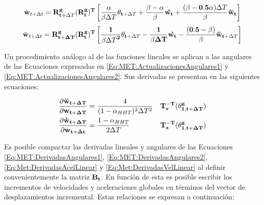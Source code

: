\begin{equation}
\label{Eq:MET:ActualizacionesAngulares1}
\begin{aligned}
\dot{\bf{w}}_{t+\Delta t} ={} & \bf{R}^g_{t+ \text{$\Delta T$}}(\bf{R}^g_{t})^T\left[\frac{\alpha}{\beta\text{$\Delta T$}}\bf{\theta}_{t+\text{$\Delta T$}}+
\frac{\beta-\alpha}{\beta}\bf{\dot{w_t}+\frac{(\beta-0.5\alpha)\text{$\Delta T$}}{\beta}}	\ddot{\bf{w}}_{t} \right ] \\
\end{aligned}
\end{equation}
\vspace{-.5cm}
\begin{equation}
\label{Eq:MET:ActualizacionesAngulares2}
\begin{aligned}
\ddot{\bf{w}}_{t+\Delta t}={} &\bf{R}^g_{t+\Delta T}(\bf{R}^g_{t})^T\left[\frac{1}{\beta\text{$\Delta T$}^2}\bf{\theta}_{t+\text{$\Delta T$}}-	\frac{1}{\beta \Delta T}\bf{\dot{w_t}-\frac{(0.5-\beta)}{\beta}}	\ddot{\bf{w}}_{t+\text{$\Delta T$}} \right ] \\
\end{aligned}
\end{equation}

Un procedimiento análogo al de las funciones lineales se aplican a las angulares de las Ecuaciones expresadas en \eqref{Eq:MET:ActualizacionesAngulares1} y \eqref{Eq:MET:ActualizacionesAngulares2}. Sus derivadas se presentan en las siguientes ecuaciones:

\begin{eqnarray}
	\label{Eq:MET:DerivadasAngulares1}
	\frac{\partial \bf{\ddot{w}_{t+\Delta T}}}{\partial \bf{{w}_{t+\Delta T}}}& = 
	\frac{4}{(1-\alpha_{HHT})^2 \Delta T^2}&  \bf{T_s^{-T}}(\bf{\theta^g_{1,{t+\Delta T}}})\\
	\label{Eq:MET:DerivadasAngulares2}
	\frac{\partial \bf{\dot{w}_{t+\Delta T}}}{\partial \bf{{w}_{t+\Delta t}}}& = 
	\frac{1-\alpha_{HHT}}{2\Delta T}& \bf{T_s^{-T}}(\bf{\theta^g_{1,{t+\Delta T}}})
\end{eqnarray}

Es posible compactar las derivadas lineales y angulares de las Ecuaciones \eqref{Eq:MET:DerivadasAngulares1}, \eqref{Eq:MET:DerivadasAngulares2}, \eqref{Eq:Met:DerivadasAcelLinear} y \eqref{Eq:Met:DerivadasVelLinear} al definir convenientemente la matriz $\bf{B_t}$. En función de esta es posible escribir los incrementos de velocidades y aceleraciones globales en términos del vector de desplazamientos incremental. Estas relaciones se expresan a continuación:

